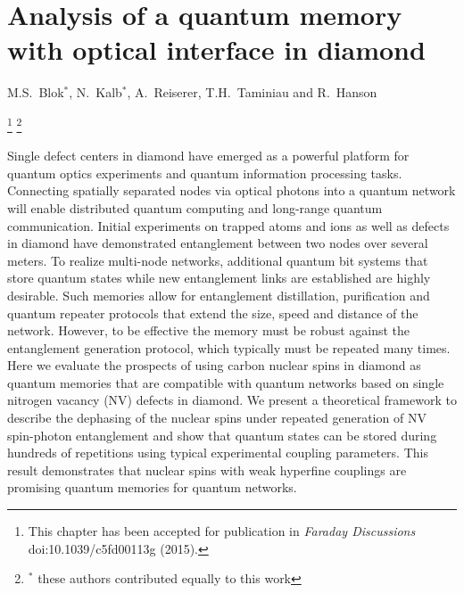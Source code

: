 \graphicspath{{./ch_C13_dephasing_LDE/figures/}}


\chapter{Analysis of a quantum memory with optical interface in diamond }
\label{ch:CDL}

\begin{center} 
    \vspace{-1cm} {M.S.~Blok$^*$, N.~Kalb$^*$, A.~Reiserer, T.H.~Taminiau and R.~Hanson} 
\end{center}

{\renewcommand{\thefootnote}{}\footnote{This chapter has been accepted for publication in
    {\em Faraday Discussions} doi:10.1039/c5fd00113g (2015).}}
{\renewcommand{\thefootnote}{}\footnote{$^*$ these authors contributed equally to this work}}

\vspace{-0.5cm} 

Single defect centers in diamond have emerged as a powerful platform for quantum optics experiments and quantum information processing tasks\cite{Gao_NatPhoton_2015}. Connecting spatially separated nodes via optical photons\cite{Kimble_Nature_2008} into a quantum network will enable distributed quantum computing and long-range quantum communication. Initial experiments on trapped atoms and ions as well as defects in diamond have demonstrated entanglement between two nodes over several meters\cite{Moehring_Nature_2007,Ritter_Nature_2012,Hofmann_Science_2012,Bernien_Nature_2013}. To realize multi-node networks, additional quantum bit systems that store quantum states while new entanglement links are established are highly desirable. Such memories allow for entanglement distillation, purification and quantum repeater protocols that extend the size, speed and distance of the network\cite{Bennett_Phys.Rev.Lett._1996,Campbell_Phys.Rev.Lett._2008,Briegel_Phys.Rev.Lett._1998,Childress_Phys.Rev.Lett._2006}. However, to be effective the memory must be robust against the entanglement generation protocol, which typically must be repeated many times. Here we evaluate the prospects of using carbon nuclear spins in diamond as quantum memories that are compatible with quantum networks based on single nitrogen vacancy (NV) defects in diamond. We present a theoretical framework to describe the dephasing of the nuclear spins under repeated generation of NV spin-photon entanglement and show that quantum states can be stored during hundreds of repetitions using typical experimental coupling parameters. This result demonstrates that nuclear spins with weak hyperfine couplings are promising quantum memories for quantum networks.
\clearpage

